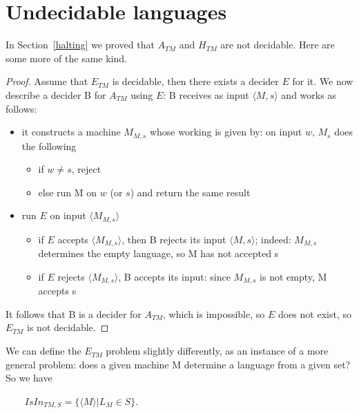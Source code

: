 \section{Undecidable languages}

In Section~\ref{halting} we proved that $A_{TM}$ and $H_{TM}$ are not
decidable. Here are some more of the same kind.

\begin{proof}
Assume that $E_{TM}$ is decidable, then there exists a decider $E$ for
it. We now describe a decider B for $A_{TM}$ using $E$:
B receives as input $\langle M,s \rangle$ and works as follows:
\begin{itemize}
\item 
it constructs a machine $M_{M,s}$ whose working is given by: on input
$w$, $M_s$ does the following
\begin{itemize}
\item if $w \neq s$, reject
\item else run M on $w$ (or $s$) and return the same result
\end{itemize}

\item 
run $E$ on input $\langle M_{M,s} \rangle$
\begin{itemize}
\item if $E$ accepts $\langle M_{M,s} \rangle$, then B rejects its
  input $\langle M,s \rangle$; indeed: $M_{M,s}$ determines the empty
  language, so M has not accepted s
\item if $E$ rejects $\langle M_{M,s} \rangle$, B accepts its input: since  $M_{M,s}$ is not empty, M accepts s
\end{itemize}

\end{itemize}
It follows that B is a decider for $A_{TM}$, which is impossible, so
$E$ does not exist, so $E_{TM}$ is not decidable.
\end{proof}

We can define the $E_{TM}$ problem slightly differently, as an instance
of a more general problem: does a given machine M determine a language
from a given set? So we have

$~~~~~~~~~IsIn_{TM,S} = \{\langle M \rangle| L_M \in S\}$.


